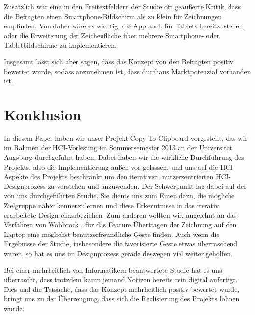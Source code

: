 \documentclass{chi-ext}
\begin{document}
Zusätzlich war eine in den Freitextfeldern der Studie oft geäußerte Kritik, dass die Befragten einen Smartphone-Bildschirm als zu klein für Zeichnungen empfinden. Von daher wäre es wichtig, die App auch für Tablets bereitzustellen, oder die Erweiterung der Zeichenfläche über mehrere Smartphone- oder Tabletbildschirme zu implementieren.

Insgesamt lässt sich aber sagen, dass das Konzept von den Befragten positiv bewertet wurde, sodass anzunehmen ist, dass durchaus Marktpotenzial vorhanden ist.


\section{Konklusion}
In diesem Paper haben wir unser Projekt Copy-To-Clipboard vorgestellt, das wir im Rahmen der HCI-Vorlesung im Sommersemester 2013 an der Universität Augsburg durchgeführt haben. Dabei haben wir die wirkliche Durchführung des Projekts, also die Implementierung außen vor gelassen, und uns auf die HCI-Aspekte des Projekts beschränkt um den iterativen, nutzerzentrierten HCI-Designprozess zu verstehen und anzuwenden.
Der Schwerpunkt lag dabei auf der von uns durchgeführten Studie. Sie diente uns zum Einen dazu, die mögliche Zielgruppe näher kennenzulernen und diese Erkenntnisse in das iterativ erarbeitete Design einzubeziehen. Zum anderen wollten wir, angelehnt an das Verfahren von Wobbrock \cite{Wobbrock}, für das Feature Übertragen der Zeichnung auf den Laptop eine möglichst benutzerfreundliche Geste finden. Auch wenn die Ergebnisse der Studie, insbesondere die favorisierte Geste etwas überraschend waren, so hat es uns im Designprozess gerade deswegen viel weiter geholfen.

Bei einer mehrheitlich von Informatikern beantwortete Studie hat es uns überrascht, dass trotzdem kaum jemand Notizen bereits rein digital anfertigt.
Dies und die Tatsache, dass das Konzept mehrheitlich positiv bewertet wurde, bringt uns zu der Überzeugung, dass sich die Realisierung des Projekts lohnen würde.




\balance


\end{document}
